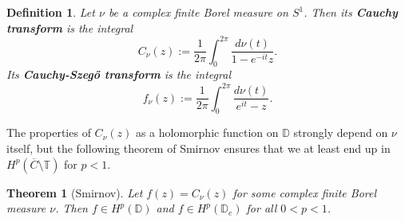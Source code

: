 \documentclass[11pt]{article}
\newtheorem{definition}{Definition}[section]
\newtheorem{theorem}{Theorem}[section]
\begin{document}
%
%
%
%

\begin{definition}
	Let $\nu$ be a complex finite Borel measure on $S^1$. Then its \textbf{Cauchy transform} is the integral
	\begin{equation}
		C_\nu(z) := \frac{1}{2\pi} \int_0^{2 \pi} \dfrac{d \nu(t)}{1 - e^{-it} z}.
	\end{equation}
	Its \textbf{Cauchy-Szeg\H{o} transform} is the integral
	\begin{equation}
		f_\nu(z) := \frac{1}{2\pi} \int_0^{2 \pi} \dfrac{d \nu(t)}{e^{it} - z}.
	\end{equation}
\end{definition}

The properties of $C_\nu(z)$ as a holomorphic function on $\mathbb{D}$ strongly depend on $\nu$ itself, but the following theorem of Smirnov ensures that we at least end up in $H^p(\overline{C}  \setminus \mathbb{T})$ for $p < 1$.

\begin{theorem}[Smirnov]
	\label{T:Smirnov}
	Let $f(z) = C_\nu(z)$ for some complex finite Borel measure $\nu$. Then $f \in H^p(\mathbb{D})$ and $f \in H^p(\mathbb{D}_e)$ for all $0 < p < 1$.
\end{theorem}
\end{document}
